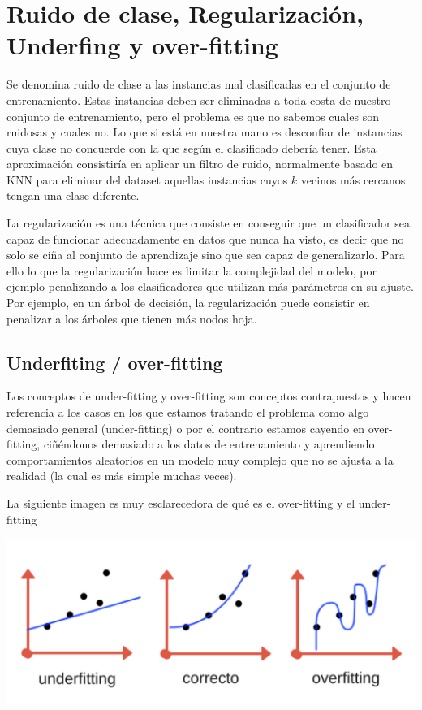 \section{Ruido de clase, Regularización, Underfing y over-fitting}
Se denomina ruido de clase a las instancias mal clasificadas en el conjunto de entrenamiento.
Estas instancias deben ser eliminadas a toda costa de nuestro conjunto de entrenamiento, pero el problema es que no sabemos cuales son ruidosas y cuales no.  
Lo que si está en nuestra mano es desconfiar de instancias cuya clase no concuerde con la que según el clasificado debería tener. Esta aproximación consistiría en aplicar un filtro de ruido, normalmente basado en KNN para eliminar del dataset aquellas instancias cuyos $k$ vecinos más cercanos tengan una clase diferente.  

La regularización es una técnica que consiste en conseguir que un clasificador sea capaz de funcionar adecuadamente en datos que nunca ha visto, es decir que no solo se ciña al conjunto de aprendizaje sino que sea capaz de generalizarlo.  
Para ello lo que la regularización hace es limitar la complejidad del modelo, por ejemplo penalizando a los clasificadores que utilizan más parámetros en su ajuste.  
Por ejemplo, en un árbol de decisión, la regularización puede consistir en penalizar a los árboles que tienen más nodos hoja.


\subsection*{Underfiting / over-fitting}

Los conceptos de under-fitting y over-fitting son conceptos contrapuestos y hacen referencia a los casos en los que estamos tratando el problema como algo demasiado general (under-fitting) o por el contrario estamos cayendo en over-fitting, ciñéndonos demasiado a los datos de entrenamiento y aprendiendo comportamientos aleatorios en un modelo muy complejo que no se ajusta a la realidad (la cual es más simple muchas veces).  

La siguiente imagen es muy esclarecedora de qué es el over-fitting y el under-fitting

\begin{center}
\includegraphics[scale=0.7]{./img/generalizacion-machine-learning.png}
\end{center}

